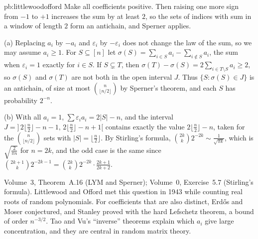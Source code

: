 \begin{solution}{pb:littlewoodofford}
\idea Make all coefficients positive. Then raising one more sign from $-1$ to $+1$ increases the sum by at least $2$, so the sets of
indices with sum in a window of length $2$ form an antichain, and Sperner applies.

\writeup (a) Replacing $a_i$ by $-a_i$ and $\varepsilon_i$ by $-\varepsilon_i$ does not change the law of the sum, so we may assume $a_i\ge1$. For $S\subseteq[n]$ let
$\sigma(S)=\sum_{i\in S}a_i-\sum_{i\notin S}a_i$, the sum when $\varepsilon_i=1$ exactly for $i\in S$. If $S\subsetneq T$, then $\sigma(T)-\sigma(S)=2\sum_{i\in T\setminus S}a_i\ge2$, so
$\sigma(S)$ and $\sigma(T)$ are not both in the open interval $J$. Thus $\{S:\sigma(S)\in J\}$ is an antichain, of size at most $\binom n{\lfloor n/2\rfloor}$
by Sperner's theorem, and each $S$ has probability $2^{-n}$.

(b) With all $a_i=1$, $\sum\varepsilon_ia_i=2|S|-n$, and the interval
$J=]\,2\lfloor\frac n2\rfloor-n-1,\,2\lfloor\frac n2\rfloor-n+1[$ contains exactly the value $2\lfloor\frac n2\rfloor-n$, taken for the $\binom n{\lfloor n/2\rfloor}$
sets with $|S|=\lfloor\frac n2\rfloor$. By Stirling's formula, $\binom{2k}k2^{-2k}\sim\frac1{\sqrt{\pi k}}$, which is $\sqrt{\frac2{\pi n}}$ for $n=2k$, and the odd
case is the same since $\binom{2k+1}k2^{-2k-1}=\binom{2k}k2^{-2k}\cdot\frac{2k+1}{2k+2}$.

\tools Volume~3, Theorem~A.16 (LYM and Sperner); Volume~0, Exercise~5.7 (Stirling's formula).
\leads Littlewood and Offord met this question in 1943 while counting real roots of random polynomials. For coefficients that are
also distinct, Erdős and Moser conjectured, and Stanley proved with the hard Lefschetz theorem, a bound of order $n^{-3/2}$.
Tao and Vu's ``inverse'' theorems explain which $a_i$ give large concentration, and they are central in random matrix theory.
\end{solution}

